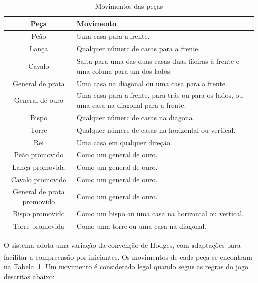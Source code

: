 	\begin{table}[H]
		\centering
		\caption{Movimentos das peças}
		\label{tab:pieces_movements}
		\begin{tabular}{c p{9cm}}
			\toprule
			\textbf{Peça} & \textbf{Movimento}\\
			\midrule
			Peão & Uma casa para a frente. \\
			Lança & Qualquer número de casas para a frente. \\
			Cavalo & Salta para uma das duas casas duas fileiras à frente e uma coluna para um dos lados. \\
			General de prata & Uma casa na diagonal ou uma casa para a frente. \\
			General de ouro & Uma casa para a frente, para trás ou para os lados, ou uma casa na diagonal para a frente. \\
			Bispo & Qualquer número de casas na diagonal. \\
			Torre & Qualquer número de casas na horizontal ou vertical. \\
			Rei & Uma casa em qualquer direção. \\
			Peão promovido & Como um general de ouro. \\
			Lança promovida & Como um general de ouro. \\
			Cavalo promovido & Como um general de ouro. \\
			General de prata promovido & Como um general de ouro. \\
			Bispo promovido & Como um bispo ou uma casa na horizontal ou vertical. \\
			Torre promovida & Como uma torre ou uma casa na diagonal. \\
			\bottomrule
		\end{tabular}
	\end{table}
	O sistema adota uma variação da convenção de Hodges, com adaptações para facilitar a compreensão por iniciantes. Os movimentos\textsuperscript{\cite{shogi-rules}} 
	de cada peça se encontram na Tabela~\ref{tab:pieces_movements}. Um movimento é considerado legal quando segue as regras do jogo descritas abaixo:

